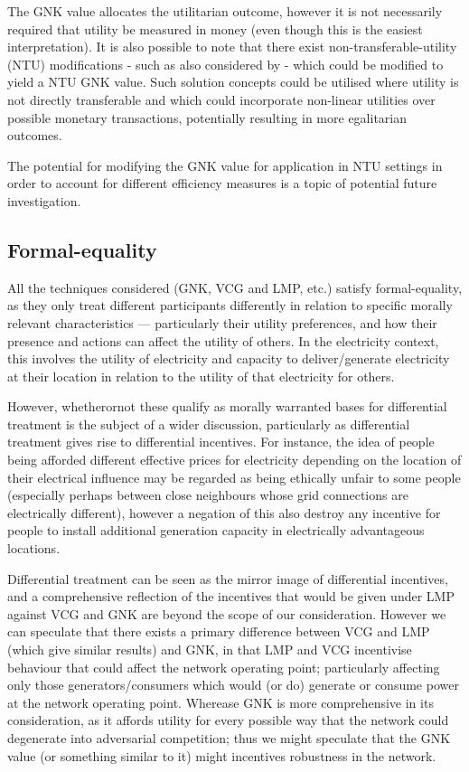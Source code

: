 The GNK value allocates the utilitarian outcome, however it is not necessarily required that utility be measured in money (even though this is the easiest interpretation).
It is also possible to note that there exist non-transferable-utility (NTU) modifications - such as also considered by \cite{value1} - which could be modified to yield a NTU GNK value.
Such solution concepts could be utilised where utility is not directly transferable and which could incorporate non-linear utilities over possible monetary transactions, potentially resulting in more egalitarian outcomes.

The potential for modifying the GNK value for application in NTU settings in order to account for different efficiency measures is a topic of potential future investigation.

\subsection{Formal-equality}

All the techniques considered (GNK, VCG and LMP, etc.) satisfy formal-equality, as they only treat different participants differently in relation to specific morally relevant characteristics --- particularly their utility preferences, and how their presence and actions can affect the utility of others.
In the electricity context, this involves the utility of electricity and capacity to deliver/generate electricity at their location in relation to the utility of that electricity for others.

However, whetherornot these qualify as morally warranted bases for differential treatment is the subject of a wider discussion, particularly as differential treatment gives rise to differential incentives.
For instance, the idea of people being afforded different effective prices for electricity depending on the location of their electrical influence may be regarded as being ethically unfair to some people (especially perhaps between close neighbours whose grid connections are electrically different), however a negation of this also destroy any incentive for people to install additional generation capacity in electrically advantageous locations.

Differential treatment can be seen as the mirror image of differential incentives, and a comprehensive reflection of the incentives that would be given under LMP against VCG and GNK are beyond the scope of our consideration.
However we can speculate that there exists a primary difference between VCG and LMP (which give similar results) and GNK, in that LMP and VCG incentivise behaviour that could affect the network operating point; particularly affecting only those generators/consumers which would (or do) generate or consume power at the network operating point.
Wherease GNK is more comprehensive in its consideration, as it affords utility for every possible way that the network could degenerate into adversarial competition; thus we might speculate that the GNK value (or something similar to it) might incentives robustness in the network.

